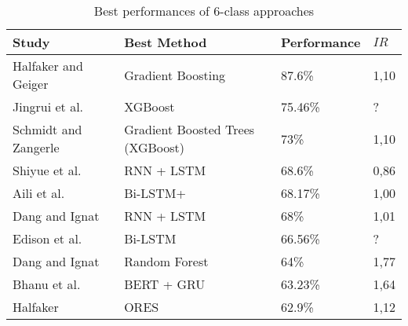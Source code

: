 \begin{table}[ht]
    \caption{Best performances of 6-class approaches}
    \label{tab:ml_performance_6class}
    \centering
    \begin{tabular}{l l l l}
        \toprule
        \textbf{Study} & \textbf{Best Method} & \textbf{Performance} & \textbf{$IR$}\\ 
        \midrule
        Halfaker and Geiger~\cite{Halfaker2020_lr1055} & Gradient Boosting & 87.6\% & 1,10 \\
        Jingrui et al.~\cite{Hou2021_lr122} & XGBoost & 75.46\% & ? \\
        Schmidt and Zangerle~\cite{Schmidt2019_lr78} & Gradient Boosted Trees (XGBoost) & 73\% & 1,10 \\
        Shiyue et al.~\cite{Zhang2018_lr41} & RNN + LSTM & 68.6\% & 0,86 \\
        Aili et al.~\cite{Shen2017_lr31} & Bi-LSTM+ & 68.17\% & 1,00 \\
        Dang and Ignat~\cite{Dang2017_lr23} & RNN + LSTM & 68\% & 1,01 \\
        Edison et al.~\cite{Marrese-Taylor2019_lr85} & Bi-LSTM & 66.56\% & ? \\
        Dang and Ignat~\cite{Dang2016_lr16} & Random Forest & 64\% & 1,77 \\
        Bhanu et al.~\cite{Guda2020_lr38} & BERT + GRU & 63.23\% & 1,64 \\
        Halfaker~\cite{Halfaker2017_lr22} & ORES & 62.9\% & 1,12 \\
        \bottomrule
    \end{tabular}
\end{table}